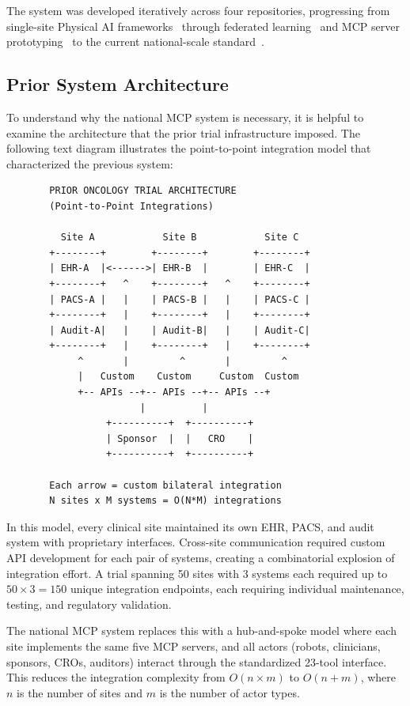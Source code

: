 \documentclass{article}
\begin{document}
The system was developed iteratively across four repositories, progressing from single-site Physical AI frameworks~\cite{kawchak2026physicalai} through federated learning~\cite{kawchak2026paifl} and MCP server prototyping~\cite{kawchak2026trialmcp} to the current national-scale standard~\cite{kawchak2026national}.

\subsection{Prior System Architecture}

To understand why the national MCP system is necessary, it is helpful to examine the architecture that the prior trial infrastructure imposed. The following text diagram illustrates the point-to-point integration model that characterized the previous system:

\begin{figure}[H]
\begin{verbatim}
  PRIOR ONCOLOGY TRIAL ARCHITECTURE
  (Point-to-Point Integrations)

    Site A            Site B            Site C
  +--------+        +--------+        +--------+
  | EHR-A  |<------>| EHR-B  |        | EHR-C  |
  +--------+   ^    +--------+   ^    +--------+
  | PACS-A |   |    | PACS-B |   |    | PACS-C |
  +--------+   |    +--------+   |    +--------+
  | Audit-A|   |    | Audit-B|   |    | Audit-C|
  +--------+   |    +--------+   |    +--------+
       ^       |         ^       |         ^
       |   Custom    Custom     Custom  Custom
       +-- APIs --+-- APIs --+-- APIs --+
                  |          |
            +----------+  +----------+
            | Sponsor  |  |   CRO    |
            +----------+  +----------+

  Each arrow = custom bilateral integration
  N sites x M systems = O(N*M) integrations
\end{verbatim}
\end{figure}

In this model, every clinical site maintained its own EHR, PACS, and audit system with proprietary interfaces. Cross-site communication required custom API development for each pair of systems, creating a combinatorial explosion of integration effort. A trial spanning 50 sites with 3 systems each required up to $50 \times 3 = 150$ unique integration endpoints, each requiring individual maintenance, testing, and regulatory validation.

The national MCP system replaces this with a hub-and-spoke model where each site implements the same five MCP servers, and all actors (robots, clinicians, sponsors, CROs, auditors) interact through the standardized 23-tool interface. This reduces the integration complexity from $O(n \times m)$ to $O(n + m)$, where $n$ is the number of sites and $m$ is the number of actor types.
\end{document}
